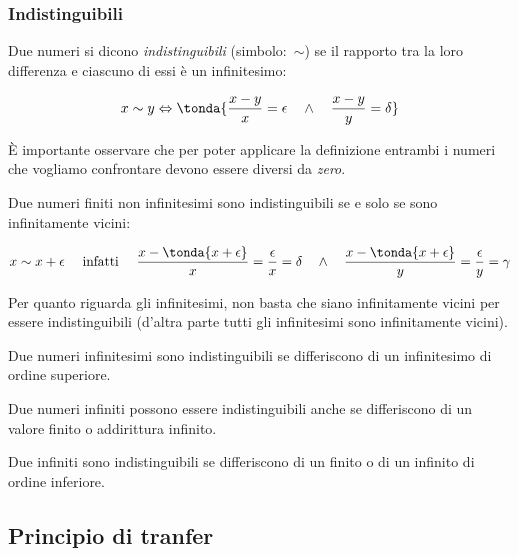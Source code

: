 \subsubsection{Indistinguibili}
\label{subsec:insnum_indistinguibili}

\begin{definizione}
Due numeri si dicono \emph{indistinguibili} (simbolo:~$\sim$) se il 
rapporto tra la loro differenza e ciascuno di essi è un infinitesimo:

\[x \sim y \Leftrightarrow 
\tonda{\frac{x-y}{x} = \epsilon \quad \wedge \quad \frac{x-y}{y} = \delta}
\]

\end{definizione}

\begin{osservazione}
 È importante osservare che per poter applicare la definizione entrambi i 
numeri che vogliamo confrontare devono essere diversi da \emph{zero}.
\end{osservazione}

\begin{definizione}
Due numeri finiti non infinitesimi sono indistinguibili se e solo se 
sono infinitamente vicini:

\[x \sim x+\epsilon \quad \text{ infatti } \quad
\frac{x-\tonda{x+\epsilon}}{x} = \frac{\epsilon}{x}= \delta \quad \wedge \quad 
\frac{x-\tonda{x+\epsilon}}{y} = \frac{\epsilon}{y}= \gamma
\]

\end{definizione}


Per quanto riguarda gli infinitesimi, non basta che siano infinitamente vicini 
per essere indistinguibili (d'altra parte tutti gli infinitesimi sono 
infinitamente vicini).

\begin{definizione}
Due numeri infinitesimi sono indistinguibili se differiscono di un 
infinitesimo di ordine superiore.
\end{definizione}

Due numeri infiniti possono essere indistinguibili anche se differiscono di un 
valore finito o addirittura infinito. 

\begin{definizione}
Due infiniti sono indistinguibili se 
differiscono di un finito o di un infinito di ordine inferiore.
\end{definizione}

\subsection{Principio di tranfer}
\label{subsec:insnum_nonarchimedei}


